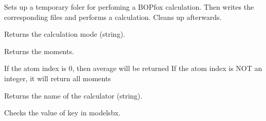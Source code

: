 \documentclass[letterpaper,10pt,english]{sphinxmanual}
\begin{document}
\begin{fulllineitems}
\begin{quote}
\begin{description}
\begin{itemize}
\end{itemize}

\end{description}\end{quote}

\begin{fulllineitems}
\label{classes:bopcal.BOPfox.calculate}
Sets up a temporary foler for perfoming a BOPfox calculation. Then 
writes the corresponding files and performs a calculation. 
Cleans up afterwards.

\end{fulllineitems}


\begin{fulllineitems}
\label{classes:bopcal.BOPfox.get_mode}
Returns the  calculation mode (string).

\end{fulllineitems}


\begin{fulllineitems}
\label{classes:bopcal.BOPfox.get_moments}
Returns the moments.

If the atom index is 0, then average will be returned
If the atom index is NOT an integer, it will return all moments

\end{fulllineitems}


\begin{fulllineitems}
\label{classes:bopcal.BOPfox.get_name}
Returns the name of the calculator (string).

\end{fulllineitems}


\begin{fulllineitems}
\label{classes:bopcal.BOPfox.inspect_modelsbx}
Checks the value of key in modelsbx.


\end{fulllineitems}
\end{fulllineitems}
\end{document}
